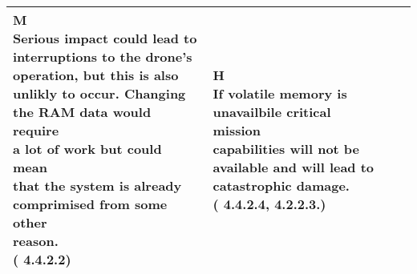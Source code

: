 \begin{center}
\begin{tabular}{|p{4cm}|p{3.5cm}|p{3.5cm}|p{3.5cm}|}
    \makecell[l]{M\\ \scriptsize Serious impact could lead to \\ \scriptsize interruptions to the drone's \\ \scriptsize operation, but this is also \\ \scriptsize unlikly to occur. Changing \\ \scriptsize the RAM data would require \\ \scriptsize a lot of work but could mean \\ \scriptsize that the system is already \\ \scriptsize comprimised from some other \\ \scriptsize reason.\\ \scriptsize (\cite{nistsp80060v1r1} 4.4.2.2)} & 
    \makecell[l]{H\\ \scriptsize If volatile memory is \\ \scriptsize unavailbile critical mission \\ \scriptsize capabilities will not be \\ \scriptsize available and will lead to \\ \scriptsize catastrophic damage.\\ \scriptsize (\cite{nistsp80060v1r1} 4.4.2.4,  4.2.2.3.)} \\ \hline
    
\end{tabular}
\end{center}

